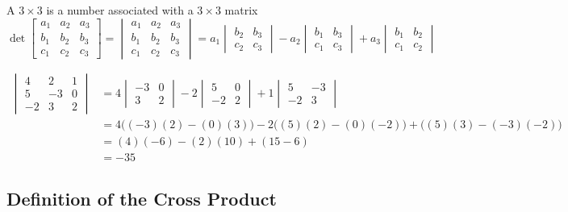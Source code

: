 \documentclass{ximera}
\begin{document}
\begin{definition}\label{def:threedetcrossprod}
A $3\times 3$  is a number associated with a $3\times 3$ matrix
$$\det{\begin{bmatrix}
a_1 & a_2 & a_3\\
b_1 & b_2 &b_3\\
c_1 &c_2 &c_3
\end{bmatrix}}=
\begin{vmatrix}
a_1 & a_2 & a_3\\
b_1 & b_2 &b_3\\
c_1 &c_2 &c_3
\end{vmatrix} =a_1
\begin{vmatrix}
b_2 & b_3\\
c_2 & c_3
\end{vmatrix} -a_2
\begin{vmatrix}
b_1 & b_3\\
c_1 & c_3
\end{vmatrix} +a_3
\begin{vmatrix}
b_1 & b_2\\
c_1 & c_2
\end{vmatrix}
$$
\end{definition}

\begin{example} \label{ex:threedetcrossprod}
\begin{align*}
\begin{vmatrix}
4 & 2 & 1\\
5 & -3 &0\\
-2 &3 &2
\end{vmatrix}&=4
\begin{vmatrix}
-3 & 0\\
3 & 2
\end{vmatrix} -2
\begin{vmatrix}
5 & 0\\
-2 & 2
\end{vmatrix} +1
\begin{vmatrix}
5 & -3\\
-2 & 3
\end{vmatrix}\\
&=4\Big ((-3)(2)-(0)(3)\Big)-2\Big((5)(2)-(0)(-2)\Big)+\Big((5)(3)-(-3)(-2)\Big)\\
&=(4)(-6)-(2)(10)+(15-6)\\
&=-35
\end{align*}
\end{example}

\subsection*{Definition of the Cross Product}
\end{document}
